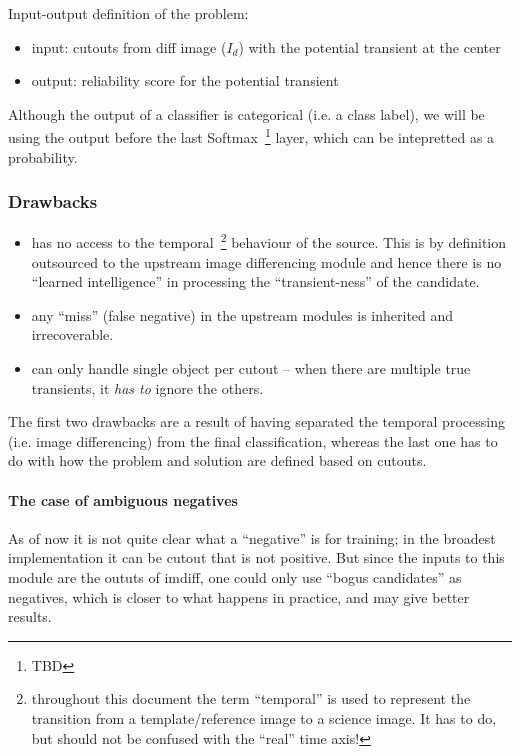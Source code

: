 Input-output definition of the problem:
\begin{itemize}
  \item input: cutouts from diff image ($I_d$) with the potential transient at the center
  \item output: reliability score for the potential transient
\end{itemize}

Although the output of a classifier is categorical (i.e. a class label), we will be using the output before the last Softmax~\footnote{TBD} layer, which can be intepretted as a probability.

\subsubsection{Drawbacks}
\begin{itemize}
\item has no access to the temporal~\footnote{throughout this document the term ``temporal'' is used to represent the transition from a template/reference image to a science image. It has to do, but should not be confused with the ``real'' time axis!} behaviour of the source. This is by definition outsourced to the upstream image differencing module and hence there is no ``learned intelligence'' in processing the ``transient-ness'' of the candidate.
\item any ``miss'' (false negative) in the upstream modules is inherited and irrecoverable.
\item can only handle single object per cutout -- when there are multiple true transients, it \emph{has to} ignore the others.
\end{itemize}

The first two drawbacks are a result of having separated the temporal processing (i.e. image differencing) from the final classification, whereas the last one has to do with how the problem and solution are defined based on cutouts.

\paragraph{The case of ambiguous negatives}
As of now it is not quite clear what a ``negative'' is for training; in the broadest implementation it can be cutout that is not positive. But since the inputs to this module are the oututs of imdiff, one could only use ``bogus candidates'' as negatives, which is closer to what happens in practice, and may give better results.


